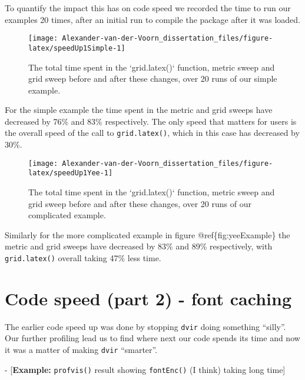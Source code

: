 \documentclass[]{article}
\begin{document}
To quantify the impact this has on code speed we recorded the time to
run our examples 20 times, after an initial run to compile the package
after it was loaded.

\begin{figure}

{\centering \texttt{[image: Alexander-van-der-Voorn\_dissertation\_files/figure-latex/speedUp1Simple-1]} 

}

\caption{The total time spent in the `grid.latex()` function, metric sweep and grid sweep before and after these changes, over 20 runs of our simple example.}\label{fig:speedUp1Simple}
\end{figure}

For the simple example the time spent in the metric and grid sweeps have
decreased by 76\% and 83\% respectively. The only speed that matters for
users is the overall speed of the call to \texttt{grid.latex()}, which
in this case has decreased by 30\%.

\begin{figure}

{\centering \texttt{[image: Alexander-van-der-Voorn\_dissertation\_files/figure-latex/speedUp1Yee-1]} 

}

\caption{The total time spent in the `grid.latex()` function, metric sweep and grid sweep before and after these changes, over 20 runs of our complicated example.}\label{fig:speedUp1Yee}
\end{figure}

Similarly for the more complicated example in figure
@ref\{fig:yeeExample\} the metric and grid sweeps have decreased by 83\%
and 89\% respectively, with \texttt{grid.latex()} overall taking 47\%
less time.

\newpage{}

\section{Code speed (part 2) - font
caching}\label{code-speed-part-2---font-caching}

The earlier code speed up was done by stopping \texttt{dvir} doing
something ``silly''. Our further profiling lead us to find where next
our code spends its time and now it was a matter of making \texttt{dvir}
``smarter''.

- {[}\textbf{Example:} \texttt{profvis()} result showing
\texttt{fontEnc()} (I think) taking long time{]}
\end{document}
